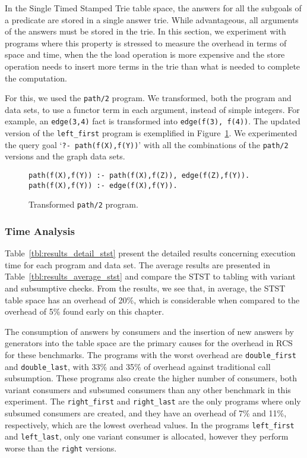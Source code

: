 In the Single Timed Stamped Trie table space, the answers for all the subgoals
of a predicate are stored in a single answer trie. While advantageous, all arguments of
the answers must be stored in the trie. In this section, we experiment with programs
where this property is stressed to measure the overhead in terms of space and time, when
the the load operation is more expensive and the store operation needs to insert more terms in
the trie than what is needed to complete the computation.

For this, we used the \texttt{path/2} program. We transformed, both the program and data sets,
to use a functor term in each argument, instead of simple integers. For example, an
\texttt{edge(3,4)} fact is transformed into \texttt{edge(f(3), f(4))}. The updated version
of the \texttt{left\_first} program is exemplified in Figure~\ref{fig:converted_path}.
We experimented the query goal `\texttt{?-~path(f(X),f(Y))}' with all the combinations of
the \texttt{path/2} versions and the graph data sets.

\begin{figure}[ht]
\begin{Verbatim}
path(f(X),f(Y)) :- path(f(X),f(Z)), edge(f(Z),f(Y)).
path(f(X),f(Y)) :- edge(f(X),f(Y)).
\end{Verbatim}
\caption{Transformed \texttt{path/2} program.}
\label{fig:converted_path}
\end{figure}

\subsubsection{Time Analysis}

Table~\ref{tbl:results_detail_stst} present the detailed results concerning execution time for each
program and data set.
The average results are presented in Table~\ref{tbl:results_average_stst} and compare the STST to
tabling with variant and subsumptive checks. From the results,
we see that, in average, the STST table space has an overhead of 20\%, which is considerable when
compared to the overhead of 5\% found early on this chapter.

The consumption of answers by consumers and the insertion of new answers by generators into the table
space are the primary causes for the overhead in RCS for these benchmarks. The programs with the
worst overhead are \texttt{double\_first} and \texttt{double\_last}, with 33\% and 35\% of overhead
against traditional call subsumption. These programs also create the higher number of consumers,
both variant consumers and subsumed consumers than any other benchmark in this experiment.
The \texttt{right\_first} and \texttt{right\_last} are the only programs where only subsumed
consumers are created, and they have an overhead of 7\% and 11\%, respectively, which are the lowest
overhead values. In the programs \texttt{left\_first} and \texttt{left\_last}, only one variant
consumer is allocated, however they perform worse than the \texttt{right} versions.

